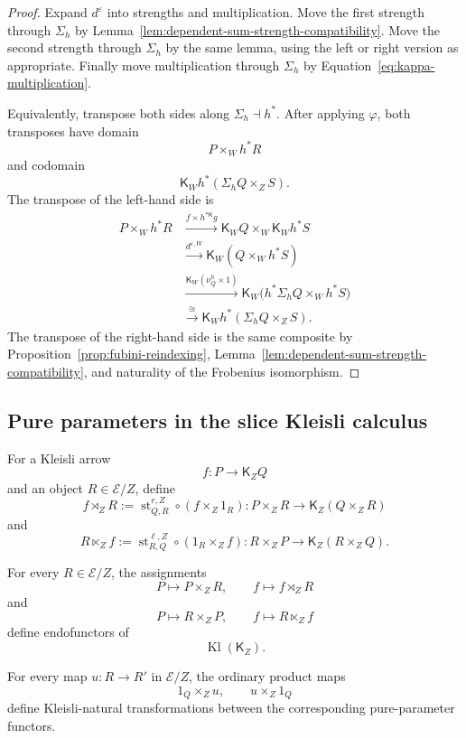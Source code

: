 \begin{proof}
Expand \(d^\varepsilon\) into strengths and multiplication.  Move the first
strength through \(\Sigma_h\) by
Lemma~\ref{lem:dependent-sum-strength-compatibility}.  Move the second
strength through \(\Sigma_h\) by the same lemma, using the left or right
version as appropriate.  Finally move multiplication through \(\Sigma_h\)
by Equation~\eqref{eq:kappa-multiplication}.

Equivalently, transpose both sides along \(\Sigma_h\dashv h^*\).  After
applying \(\varphi\), both transposes have domain
\[
    P\times_Wh^*R
\]
and codomain
\[
    \mathsf K_Wh^*(\Sigma_hQ\times_ZS).
\]
The transpose of the left-hand side is
\[
\begin{aligned}
P\times_Wh^*R
&\xrightarrow{
    f\times h^{*\mathsf K}g
}
\mathsf K_WQ\times_W\mathsf K_Wh^*S
\\
&\xrightarrow{
    d^{\varepsilon,W}
}
\mathsf K_W(Q\times_Wh^*S)
\\
&\xrightarrow{
    \mathsf K_W(\nu^h_Q\times 1)
}
\mathsf K_W
\bigl(
    h^*\Sigma_hQ\times_Wh^*S
\bigr)
\\
&\xrightarrow{\cong}
\mathsf K_Wh^*(\Sigma_hQ\times_ZS).
\end{aligned}
\]
The transpose of the right-hand side is the same composite by
Proposition~\ref{prop:fubini-reindexing},
Lemma~\ref{lem:dependent-sum-strength-compatibility}, and naturality of the
Frobenius isomorphism.
\end{proof}

\subsection{Pure parameters in the slice Kleisli calculus}
\label{subsec:pure-parameter-kleisli-calculus}

For a Kleisli arrow
\[
    f:P\longrightarrow\mathsf K_ZQ
\]
and an object \(R\in\mathcal E/Z\), define
\[
    f\rtimes_ZR
    :=
    \operatorname{st}^{r,Z}_{Q,R}
    \circ
    (f\times_Z1_R):
    P\times_ZR
    \longrightarrow
    \mathsf K_Z(Q\times_ZR)
\]
and
\[
    R\ltimes_Zf
    :=
    \operatorname{st}^{\ell,Z}_{R,Q}
    \circ
    (1_R\times_Zf):
    R\times_ZP
    \longrightarrow
    \mathsf K_Z(R\times_ZQ).
\]

\begin{proposition}
\label{prop:pure-parameter-kleisli-functors}
For every \(R\in\mathcal E/Z\), the assignments
\[
    P\longmapsto P\times_ZR,
    \qquad
    f\longmapsto f\rtimes_ZR
\]
and
\[
    P\longmapsto R\times_ZP,
    \qquad
    f\longmapsto R\ltimes_Zf
\]
define endofunctors of
\[
    \operatorname{Kl}(\mathsf K_Z).
\]

For every map \(u:R\to R'\) in \(\mathcal E/Z\), the ordinary product maps
\[
    1_Q\times_Zu,
    \qquad
    u\times_Z1_Q
\]
define Kleisli-natural transformations between the corresponding
pure-parameter functors.
\end{proposition}

